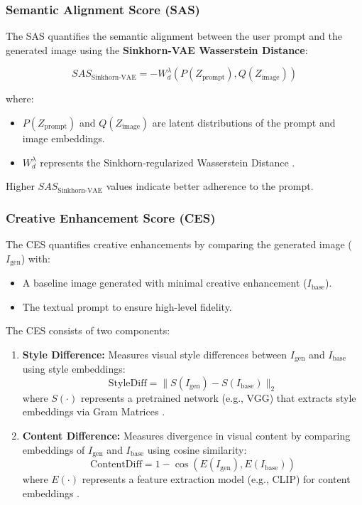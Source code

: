 \subsubsection{Semantic Alignment Score (SAS)}
The SAS quantifies the semantic alignment between the user prompt and the generated image using the \textbf{Sinkhorn-VAE Wasserstein Distance}:

\begin{equation}
SAS_{\text{Sinkhorn-VAE}} = -W_d^\lambda(P(Z_{\text{prompt}}), Q(Z_{\text{image}}))
\end{equation}

\noindent where:
\begin{itemize}
    \item $P(Z_{\text{prompt}})$ and $Q(Z_{\text{image}})$ are latent distributions of the prompt and image embeddings.
    \item $W_d^\lambda$ represents the Sinkhorn-regularized Wasserstein Distance \cite{peyreetal2020, wasserstein_autoencoders}.
\end{itemize}

Higher $SAS_{\text{Sinkhorn-VAE}}$ values indicate better adherence to the prompt.

\subsubsection{Creative Enhancement Score (CES)}
The CES quantifies creative enhancements by comparing the generated image ($I_{\text{gen}}$) with:
\begin{itemize}
    \item A baseline image generated with minimal creative enhancement ($I_{\text{base}}$).
    \item The textual prompt to ensure high-level fidelity.
\end{itemize}

The CES consists of two components:
\begin{enumerate}
    \item \textbf{Style Difference:} Measures visual style differences between $I_{\text{gen}}$ and $I_{\text{base}}$ using style embeddings:
    \begin{equation}
    \text{StyleDiff} = \| S(I_{\text{gen}}) - S(I_{\text{base}}) \|_2
    \end{equation}
    where $S(\cdot)$ represents a pretrained network (e.g., VGG) that extracts style embeddings via Gram Matrices \cite{gatys2016neural}.
    
    \item \textbf{Content Difference:} Measures divergence in visual content by comparing embeddings of $I_{\text{gen}}$ and $I_{\text{base}}$ using cosine similarity:
    \begin{equation}
    \text{ContentDiff} = 1 - \cos(E(I_{\text{gen}}), E(I_{\text{base}}))
    \end{equation}
    where $E(\cdot)$ represents a feature extraction model (e.g., CLIP) for content embeddings \cite{radford2021clip}.
\end{enumerate}

